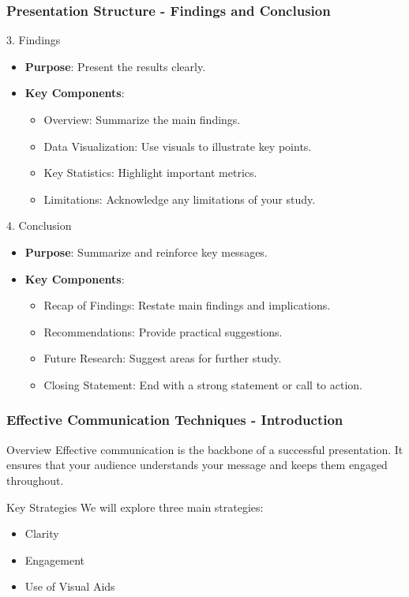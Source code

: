 \documentclass[aspectratio=169]{beamer}
\begin{document}
\begin{frame}[fragile]
    \frametitle{Presentation Structure - Findings and Conclusion}
    \begin{block}{3. Findings}
        \begin{itemize}
            \item \textbf{Purpose}: Present the results clearly.
            \item \textbf{Key Components}:
            \begin{itemize}
                \item Overview: Summarize the main findings.
                \item Data Visualization: Use visuals to illustrate key points.
                \item Key Statistics: Highlight important metrics.
                \item Limitations: Acknowledge any limitations of your study.
            \end{itemize}
        \end{itemize}
    \end{block}

    \begin{block}{4. Conclusion}
        \begin{itemize}
            \item \textbf{Purpose}: Summarize and reinforce key messages.
            \item \textbf{Key Components}:
            \begin{itemize}
                \item Recap of Findings: Restate main findings and implications.
                \item Recommendations: Provide practical suggestions.
                \item Future Research: Suggest areas for further study.
                \item Closing Statement: End with a strong statement or call to action.
            \end{itemize}
        \end{itemize}
    \end{block}
\end{frame}

\begin{frame}[fragile]
    \frametitle{Effective Communication Techniques - Introduction}
    \begin{block}{Overview}
        Effective communication is the backbone of a successful presentation. It ensures that your audience understands your message and keeps them engaged throughout.
    \end{block}
    \begin{block}{Key Strategies}
        We will explore three main strategies:
        \begin{itemize}
            \item Clarity
            \item Engagement
            \item Use of Visual Aids
        \end{itemize}
    \end{block}
\end{frame}
\end{document}
